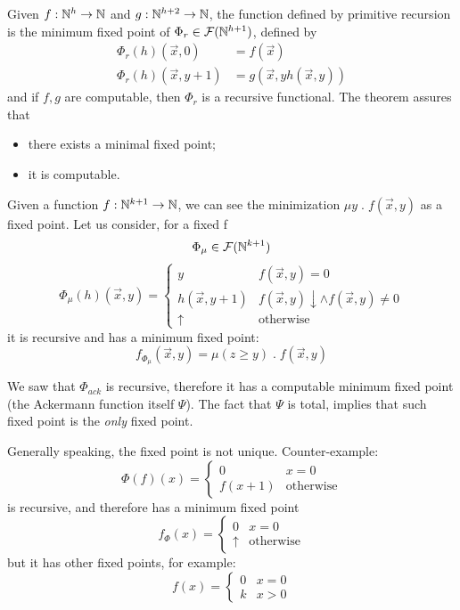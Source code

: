 \begin{example}
Given $f : \mathbb{N}^h \to \mathbb{N}$ and
$g : \mathbb{N}^{h+2} \to \mathbb{N}$, the function defined by primitive
recursion is the minimum fixed point of
$\Phi_r \in \mathcal{F}(\mathbb{N}^{h+1})$, defined by
\begin{align*}
    \Phi_r(h)(\vec{x}, 0) & =  f(\vec{x}) \\
    \Phi_r(h)(\vec{x}, y+1) & =  g(\vec{x}, y h(\vec{x},y))
\end{align*}
and if $f,g$ are computable, then $\Phi_r$ is a recursive
functional. The theorem assures that
\begin{itemize}
\item there exists a minimal fixed point;
\item it is computable.
\end{itemize}
\end{example}

\begin{example}[Minimalisation]
Given a function $f: \mathbb{N}^{k+1} \to \mathbb{N}$, we can see the
minimization $\mu y \; . \; f(\vec{x}, y)$ as a fixed point. Let us
consider, for a fixed f
\[
  \Phi_\mu \in \mathcal{F}(\mathbb{N}^{k+1})
\]
\[
  \Phi_\mu(h)(\vec{x}, y) = \begin{cases}
    y & f(\vec{x},y) = 0 \\
    h(\vec{x}, y+1) & f(\vec{x}, y)\downarrow \land f(\vec{x}, y) \neq 0 \\
    \uparrow & \mbox{otherwise}
  \end{cases}
\]
it is recursive and has a minimum fixed point:
\[
  f_{\Phi_\mu}(\vec{x}, y) = \mu (z \geq y) \; . \; f(\vec{x}, y)
\]
\end{example}

\begin{example}
We saw that $\Phi_{ack}$ is recursive, therefore it has a computable
minimum fixed point (the Ackermann function itself $\Psi$). The fact
that $\Psi$ is total, implies that such fixed point is the
\emph{only} fixed point.
\end{example}

\begin{observation}
  Generally speaking, the fixed point is not unique. Counter-example:
  \[
    \Phi(f)(x) = \begin{cases}
      0 & x=0 \\
      f(x+1) & \mbox{otherwise}
    \end{cases}
  \]
  is recursive, and therefore has a minimum fixed point
  \[
    f_\Phi(x) = \begin{cases}
      0 & x=0 \\
      \uparrow & \mbox{otherwise}
    \end{cases}
  \]
  but it has other fixed points, for example:
  \[
    f(x) = \begin{cases}
      0 & x=0 \\
      k & x>0
    \end{cases}
  \]
\end{observation}
